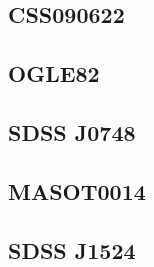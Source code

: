 \subsection{CSS090622}

\subsection{OGLE82}

\subsection{SDSS J0748}

\subsection{MASOT0014}

\subsection{SDSS J1524}


\newpage

